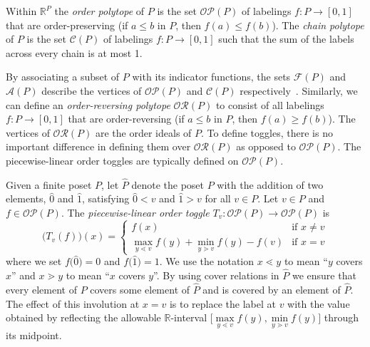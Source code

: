 \documentclass[ALCO,ThmDefs,Unicode,epreuves]{cedram}
\newcommand{\defn}[1]{\emph{#1}}
\newcommand{\rr}{\mathbb{R}}
\newcommand{\ra}{\rightarrow}
\newcommand{\cala}{\mathcal{A}}
\newcommand{\calc}{\mathcal{C}}
\newcommand{\calf}{\mathcal{F}}
\newcommand{\calo}{\mathcal{O}}
\newcommand{\calp}{\mathcal{P}}
\newcommand{\calr}{\mathcal{R}}
\begin{document}
\begin{defi}
Within $\rr^{P}$ the \defn{order polytope} of $P$ is the set $\calo\calp(P)$ of labelings $f:P\ra [0,1]$ that are order-preserving (\ie if $a\leq b$ in $P$, then $f(a)\leq f(b)$).
The \defn{chain polytope} of $P$ is the set $\calc(P)$ of labelings $f:P\ra [0,1]$ such that the sum of the labels across every chain is at most 1.
\end{defi}

By associating a subset of $P$ with its indicator functions, the sets $\calf(P)$ and $\cala(P)$ describe the vertices of $\calo\calp(P)$ and $\calc(P)$ respectively~\cite{Sta86}.
Similarly, we can define an \defn{order-reversing polytope} $\calo\calr(P)$ to consist of all labelings $f:P\ra [0,1]$ that are order-reversing (\ie if $a\leq b$ in $P$, then $f(a)\geq f(b)$). The vertices of $\calo\calr(P)$ are the order ideals of $P$.
To define toggles, there is no important difference in defining them over $\calo\calr(P)$ as opposed to $\calo\calp(P)$. The piecewise-linear order toggles are typically defined on $\calo\calp(P)$.

\begin{defi}
Given a finite poset $P$, let $\widehat{P}$ denote the poset $P$ with the addition of two
elements, $\widehat{0}$ and $\widehat{1}$, satisfying $\widehat{0}< v$ and $\widehat{1}>v$
for all $v\in P$. 
Let $v\in P$ and $f\in\calo\calp(P)$.
The \defn{piecewise-linear order toggle} $T_v:\calo\calp(P)\ra \calo\calp(P)$ is
\[
\big(T_v(f)\big)(x) =
\begin{cases}
f(x) &\text{if }x\not=v\\
\max\limits_{y\lessdot v} f(y) + 
\min\limits_{y\gtrdot v} f(y) - f(v)
&\text{if }x=v\end{cases}
\]
where we set $f\big(\widehat{0}\big)=0$ and $f\big(\widehat{1}\big)=1$.
We use the notation $x\lessdot y$ to mean ``$y$ covers $x$'' and $x\gtrdot y$ to mean ``$x$
covers $y$''. By using cover relations in $\widehat{P}$ we ensure that every element
of $P$ covers some element of $\widehat{P}$ and is covered by an element of $\widehat{P}$. 
The effect of this involution at $x=v$ is to replace the label at $v$ with the value obtained
by reflecting the allowable $\rr$-interval $\Big[\max\limits_{y\lessdot v} f(y), \min\limits_{y\gtrdot
v} f(y)\Big]$ through its midpoint.
\end{defi}
\end{document}
